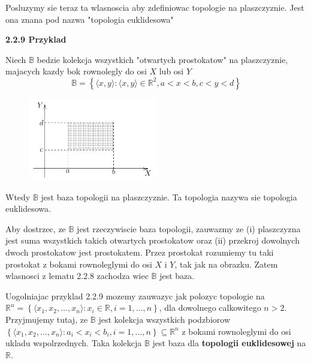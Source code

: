 \documentclass{article}
\begin{document}
Posluzymy sie teraz ta wlasnoscia aby zdefiniowac topologie na plaszczyznie. Jest ona znana pod nazwa "topologia euklidesowa"

\textbf{2.2.9 Przyklad}

Niech $\mathbb{B}$ bedzie kolekcja wszystkich "otwartych prostokatow" na plaszczyznie, majacych kazdy bok rownolegly do osi $X$ lub osi $Y$
$$\mathbb{B} = \left\{ \langle x,y \rangle : \langle x,y \rangle \in \mathbb{R}^{2}, a<x<b, c<y<d   \right\}$$

\begin{figure}[h]
    \centering
    \includegraphics[width=0.5\textwidth]{rectangle2_2_9.png}
\end{figure}

Wtedy $\mathbb{B}$ jest baza topologii na plaszczyznie. Ta topologia nazywa sie topologia euklidesowa.

Aby dostrzec, ze $\mathbb{B}$ jest rzeczywiscie baza topologii, zauwazmy ze (i) plaszczyzna jest suma wszystkich takich otwartych prostokatow oraz (ii) przekroj dowolnych dwoch prostokatow jest prostokatem. Przez prostokat rozumiemy tu taki prostokat z bokami rownoleglymi do osi $X$ i $Y$, tak jak na obrazku. Zatem wlasnosci z lematu 2.2.8 zachodza wiec $\mathbb{B}$ jest baza.

\begin{tcolorbox}[colback=white!90!green,colframe=black!35!green,title=2.2.10 Lematokomentarz: Uogolnienie Przykladu 2.2.9]

    Uogolniajac przyklad 2.2.9 mozemy zauwazyc jak polozyc topologie na $\mathbb{R}^{n} = \left\{ \langle x_{1}, x_{2}, \dots, x_{n} \rangle : x_{i} \in \mathbb{R}, i = 1, \dots, n \right\}$, dla dowolnego calkowitego $n > 2$. Przyjmujemy tutaj, ze $\mathbb{B}$ jest kolekcja wszystkich podzbiorow $\left\{ \langle x_{1}, x_{2}, \dots, x_{n} \rangle :a_{i} <  x_{i} < b_{i}, i = 1, \dots, n \right\} \subseteq \mathbb{R}^{n}$ z bokami rownoleglymi do osi ukladu wspolrzednych. Taka kolekcja $\mathbb{B}$ jest baza dla \textbf{topologii euklidesowej} na $\mathbb{R}$.
\end{tcolorbox}
\end{document}
